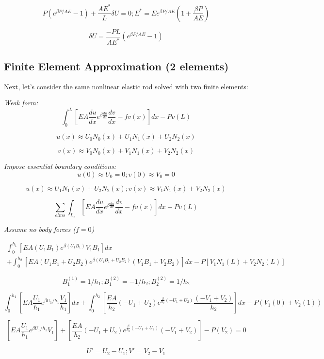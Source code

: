 \documentclass[12pt,american]{article}
\def\beq{\begin{equation}}
\def\eeq{\end{equation}}
\begin{document}
\beq 
P \left( e^{\beta P/AE} -1 \right) + \frac{AE^*}{L} \delta U = 0; E^* = E e^{\beta P/AE} \left( 1 + \frac{\beta P}{AE} \right)
\eeq 

\beq 
\delta U = \frac{-PL}{AE^*} \left( e^{\beta P/AE} - 1 \right)
\eeq 

\subsection{Finite Element Approximation (2 elements)}
Next, let's consider the same nonlinear elastic rod solved with two finite elements:

{\em Weak form:}
\beq 
\int_0^L \left[ EA \frac{du}{dx} e^{\beta \frac{du}{dx}} \frac{dv}{dx} - fv(x) \right] dx - Pv(L)
\eeq 

\beq 
u(x) \approx U_0N_0(x) + U_1N_1(x) + U_2N_2(x)
\eeq 

\beq 
v(x) \approx V_0N_0(x) + V_1N_1(x) + V_2N_2(x)
\eeq 

{\em Impose essential boundary conditions:}
\beq 
u(0) \approx U_0 = 0; v(0) \approx V_0 = 0
\eeq 

\beq 
u(x) \approx U_1N_1(x) + U_2N_2(x); v(x) \approx V_1N_1(x) + V_2N_2(x)
\eeq 

\beq 
\sum_{elms} \int_{L_e} \left[ EA \frac{du}{dx} e^{\beta \frac{du}{dx}} \frac{dv}{dx} - fv(x) \right] dx - Pv(L)
\eeq 

{\em Assume no body forces ($f=0$)}

\begin{align*}
\int_0^{h_1} \left[ EA \left(U_1B_1 \right) e^{\beta \left(U_1B_1 \right)} V_1B_1 \right] dx
\\
+ \int_0^{h_2} \left[ EA \left(U_1B_1 +U_2B_2 \right) e^{\beta \left(U_1B_1 + U_2B_2\right)} \left( V_1B_1 + V_2 B_2 \right) \right] dx - P \left[ V_1N_1(L) + V_2 N_2(L) \right]
\end{align*}

\beq
B_1^{(1)} = 1/h_1; B_1^{(2)} = -1/h_2; B_2^{(2)} = 1/h_2
\eeq

\beq
\int_0^{h_1} \left[ EA \frac{U_1}{h_1}e^{\beta U_1/h_1}\frac{V_1}{h_1} \right]dx + \int_0^{h_2} \left[ \frac{EA}{h_2}(-U_1+U_2) e^{\frac{\beta}{h_2}(-U_1+U_2)}\frac{(-V_1+V_2)}{h_2}  \right]dx - P(V_1(0) + V_2(1))
\eeq

\beq
\left[ EA \frac{U_1}{h_1}e^{\beta U_1/h_1}V_1 \right] + \left[ \frac{EA}{h_2}(-U_1+U_2) e^{\frac{\beta}{h_2}(-U_1+U_2)}(-V_1+V_2) \right] - P(V_2) = 0
\eeq

\beq
U'=U_2-U_1 ; V'=V_2-V_1
\eeq
\end{document}
